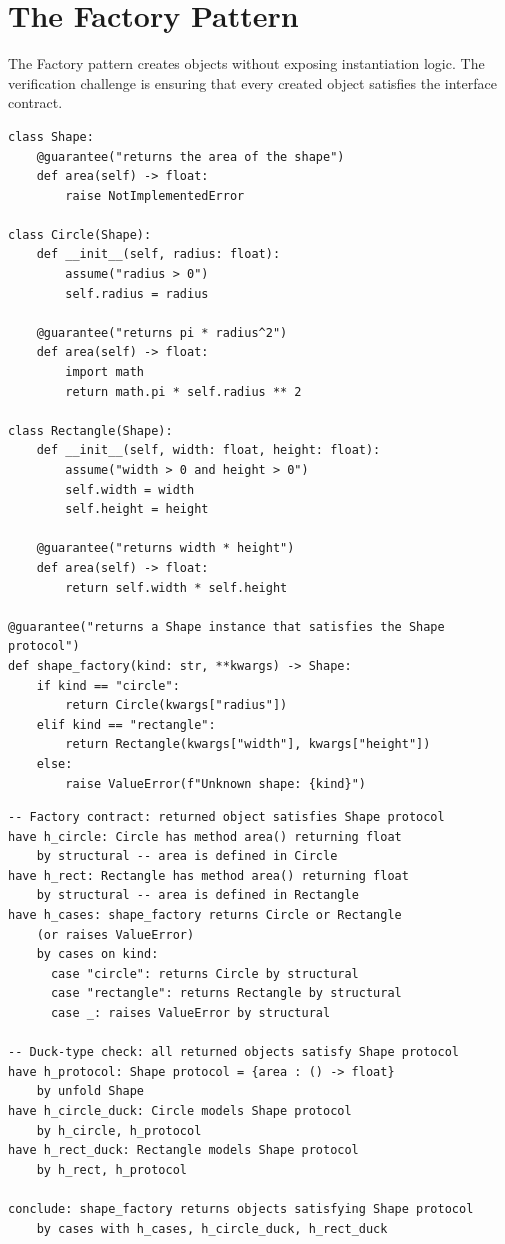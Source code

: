 \documentclass[11pt,a4paper]{report}
\theoremstyle{definition}
\theoremstyle{plain}
\begin{document}
\section{The Factory Pattern}

The Factory pattern creates objects without exposing instantiation logic.
The verification challenge is ensuring that every created object satisfies
the interface contract.

\begin{lstlisting}[style=synhopy]
class Shape:
    @guarantee("returns the area of the shape")
    def area(self) -> float:
        raise NotImplementedError

class Circle(Shape):
    def __init__(self, radius: float):
        assume("radius > 0")
        self.radius = radius

    @guarantee("returns pi * radius^2")
    def area(self) -> float:
        import math
        return math.pi * self.radius ** 2

class Rectangle(Shape):
    def __init__(self, width: float, height: float):
        assume("width > 0 and height > 0")
        self.width = width
        self.height = height

    @guarantee("returns width * height")
    def area(self) -> float:
        return self.width * self.height

@guarantee("returns a Shape instance that satisfies the Shape protocol")
def shape_factory(kind: str, **kwargs) -> Shape:
    if kind == "circle":
        return Circle(kwargs["radius"])
    elif kind == "rectangle":
        return Rectangle(kwargs["width"], kwargs["height"])
    else:
        raise ValueError(f"Unknown shape: {kind}")
\end{lstlisting}

\begin{lstlisting}[style=proof]
-- Factory contract: returned object satisfies Shape protocol
have h_circle: Circle has method area() returning float
    by structural -- area is defined in Circle
have h_rect: Rectangle has method area() returning float
    by structural -- area is defined in Rectangle
have h_cases: shape_factory returns Circle or Rectangle
    (or raises ValueError)
    by cases on kind:
      case "circle": returns Circle by structural
      case "rectangle": returns Rectangle by structural
      case _: raises ValueError by structural

-- Duck-type check: all returned objects satisfy Shape protocol
have h_protocol: Shape protocol = {area : () -> float}
    by unfold Shape
have h_circle_duck: Circle models Shape protocol
    by h_circle, h_protocol
have h_rect_duck: Rectangle models Shape protocol
    by h_rect, h_protocol

conclude: shape_factory returns objects satisfying Shape protocol
    by cases with h_cases, h_circle_duck, h_rect_duck
\end{lstlisting}
\end{document}

